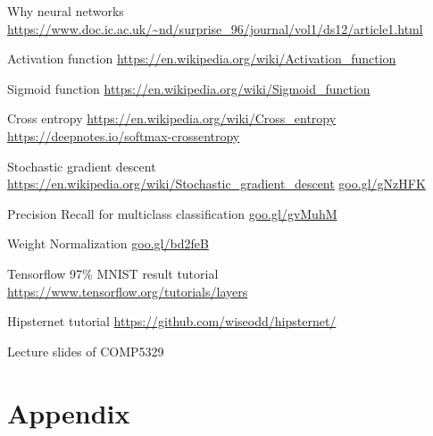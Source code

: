 \documentclass[fleqn,10pt]{SelfArx} %
\begin{document}
\begin{thebibliography}{9}
Why neural networks
\newline
\url{https://www.doc.ic.ac.uk/~nd/surprise_96/journal/vol1/ds12/article1.html}

Activation function
\newline
\url{https://en.wikipedia.org/wiki/Activation\_function}

Sigmoid function
\newline
\url{https://en.wikipedia.org/wiki/Sigmoid\_function}

Cross entropy
\newline
\url{https://en.wikipedia.org/wiki/Cross\_entropy}
\url{https://deepnotes.io/softmax-crossentropy}

Stochastic gradient descent
\newline
\url{https://en.wikipedia.org/wiki/Stochastic\_gradient\_descent}
\url{goo.gl/gNzHFK}

Precision Recall for multiclass classification
\url{goo.gl/gvMuhM}

Weight Normalization
\url{goo.gl/bd2feB}

Tensorflow 97\% MNIST result tutorial
\url{https://www.tensorflow.org/tutorials/layers}

Hipsternet tutorial
\url{https://github.com/wiseodd/hipsternet/}

Lecture slides of COMP5329

 \end{thebibliography}


\section{Appendix}
\end{document}

